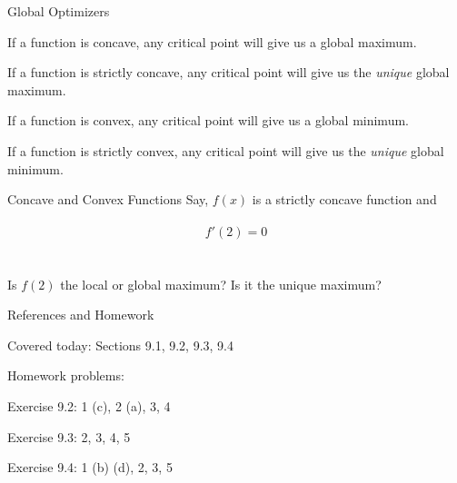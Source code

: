 \documentclass{./../../Latex/teaching_slides}
\begin{document}
\begin{frame}{Global Optimizers}
\begin{witemize}
  \item If a function is concave, any critical point will give us a global maximum.
  \item If a function is strictly concave, any critical point will give us the \textit{unique} global maximum.
  \item If a function is convex, any critical point will give us a global minimum.
  \item If a function is strictly convex, any critical point will give us the \textit{unique} global minimum.
\end{witemize}
\end{frame}


\begin{frame}{Concave and Convex Functions}
Say, $f(x)$ is a strictly concave function and \\~\\
$$f'(2) = 0 $$ \\~\\
Is $f(2)$ the local or global maximum? Is it the unique maximum?
\end{frame}




\begin{frame}{References and Homework}
\begin{witemize}
  \item Covered today: Sections 9.1, 9.2, 9.3, 9.4
  \item Homework problems: \\
  \begin{witemize}
  \normalsize
  \item Exercise 9.2: 1 (c), 2 (a), 3, 4
  \item Exercise 9.3: 2, 3, 4, 5 
  \item Exercise 9.4: 1 (b) (d), 2, 3, 5
	\end{witemize}
\end{witemize}

\end{frame}
\end{document}
